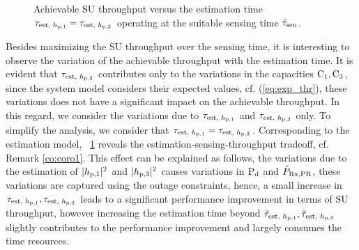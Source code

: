 \begin{figure}

\centering
{}
\caption{Achievable SU throughput versus the estimation time $\tau_{\text{est, $h_{\text{p,1}}$}} = \tau_{\text{est, $h_{\text{p,3}}$}}$ operating at the suitable sensing time $\tilde{\tau}_{\text{sen}}$.}
\label{fig:optT_est_time}
\end{figure}
Besides maximizing the SU throughput over the sensing time, it is interesting to observe the variation of the achievable throughput with the estimation time. It is evident that $\tau_{\text{est, $h_{\text{p,2}}$}}$ contributes only to the variations in the capacities $\text{C}_{\text{1}}, \text{C}_{\text{3}}$, since the system model considers their expected values, cf. (\ref{eq:exp_thr}), these variations does not have a significant impact on the achievable throughput. In this regard, we consider the variations due to $\tau_{\text{est, $h_{\text{p,1}}$}}$ and $\tau_{\text{est, $h_{\text{p,3}}$}}$ only. To simplify the analysis, we consider that $\tau_{\text{est, $h_{\text{p,1}}$}} = \tau_{\text{est, $h_{\text{p,3}}$}}$. Corresponding to the estimation model, \figurename~\ref{fig:optT_est_time} reveals the estimation-sensing-throughput tradeoff, cf. Remark \ref{co:coro1}. This effect can be explained as follows, the variations due to the estimation of $|h_{\text{p,1}}|^2$ and $|h_{\text{p,3}}|^2$ causes variations in $\text{P}_{\text{d}}$ and $\hat{P}_{\text{Rx,PR}}$, these variations are captured using the outage constraints, hence, a small increase in $\tau_{\text{est, $h_{\text{p,1}}$}}, \tau_{\text{est, $h_{\text{p,3}}$}}$ leads to a significant performance improvement in terms of SU throughput, however increasing the estimation time beyond $\tilde{\tau}_{\text{est, $h_{\text{p,1}}$}}, \tilde{\tau}_{\text{est, $h_{\text{p,3}}$}}$ slightly contributes to the performance improvement and largely consumes the time resources. 

